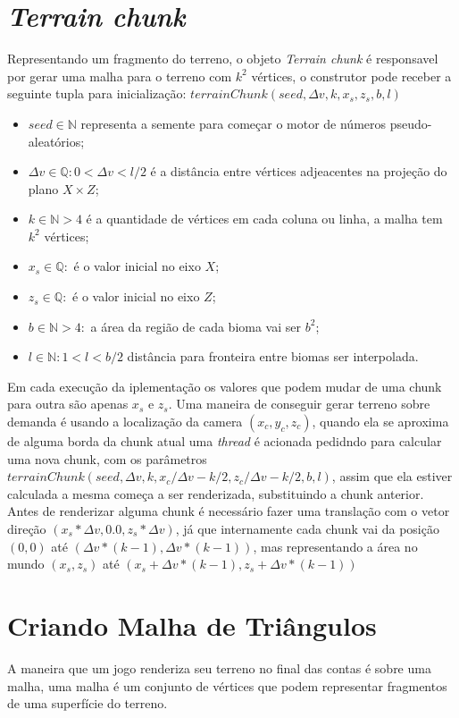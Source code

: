 \section{\textit{Terrain chunk}}
Representando um fragmento do terreno, o objeto \textit{Terrain chunk} é responsavel
por gerar uma malha para o terreno com $k^2$ vértices, o construtor pode receber 
a seguinte tupla para inicialização: 
$terrainChunk(seed, \Delta{v}, k, x_{s}, z_{s}, b, l)$
\begin{itemize}
    \item $seed \in \mathbb{N}$ representa a semente para começar o motor de números
    pseudo-aleatórios;
    \item $\Delta{v} \in \mathbb{Q}:0 < \Delta{v} < l/2$ é a distância entre vértices adjeacentes na
    projeção do plano $X \times Z$;
    \item $k \in \mathbb{N}>4$ é a quantidade de vértices em cada coluna ou 
    linha, a malha tem $k^2$ vértices;
    \item $x_{s} \in \mathbb{Q}:$ é o valor inicial no eixo $X$;
    \item $z_{s} \in \mathbb{Q}:$ é o valor inicial no eixo $Z$;
    \item $b \in \mathbb{N}>4:$ a área da região de cada bioma vai ser $b^2$;
    \item $l \in \mathbb{N}:1 < l < b/2$ distância para fronteira entre biomas ser interpolada.
\end{itemize}


Em cada execução da iplementação os valores que podem mudar de uma chunk para 
outra são apenas $x_{s}$ e $z_{s}$. Uma maneira de conseguir gerar terreno sobre demanda
é usando a localização da camera $(x_{c}, y_{c}, z_{c})$, quando ela se
aproxima de alguma borda da chunk atual
uma \textit{thread} é acionada pedidndo para calcular uma nova chunk, com os parâmetros
$terrainChunk(seed, \Delta{v}, k, x_{c}/\Delta{v} - k/2, z_{c}/\Delta{v} - k/2, b, l)$, assim que ela %
estiver calculada a mesma começa a ser renderizada, substituindo a chunk anterior.
Antes de renderizar alguma chunk é necessário fazer uma translação com o vetor direção 
$(x_{s} * \Delta{v}, 0.0, z_{s} * \Delta{v})$, já que internamente cada chunk vai 
da posição $(0, 0)$ até $(\Delta{v}*(k-1), \Delta{v}*(k-1))$, mas representando a área 
no mundo $(x_{s}, z_{s})$ até $(x_{s} + \Delta{v}*(k-1), z_{s} + \Delta{v}*(k-1))$

\section{Criando Malha de Triângulos}
A maneira que um jogo renderiza seu terreno no final das contas é sobre uma
malha, uma malha é um conjunto de vértices que podem representar fragmentos
de uma superfície do terreno.

